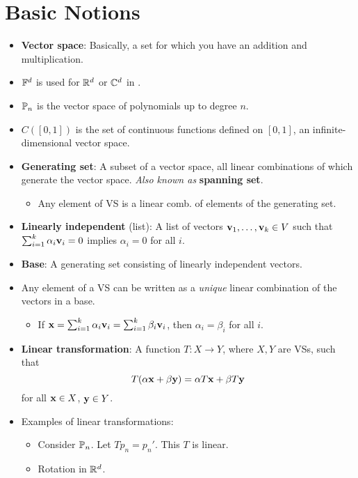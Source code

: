 \documentclass[../../notes.tex]{subfiles}
\begin{document}
\chapter{Basic Notions}
\begin{itemize}
    \item {}\textbf{Vector space}: Basically, a set for which you have an addition and multiplication.
    \item $\mathbb{F}^d$ is used for $\mathbb{R}^d$ or $\mathbb{C}^d$ in \textcite{bib:Treil}.
    \item $\mathbb{P}_n$ is the vector space of polynomials up to degree $n$.
    \item $C([0,1])$ is the set of continuous functions defined on $[0,1]$, an infinite-dimensional vector space.
    \item \textbf{Generating set}: A subset of a vector space, all linear combinations of which generate the vector space. \emph{Also known as} \textbf{spanning set}.
    \begin{itemize}
        \item Any element of VS is a linear comb. of elements of the generating set.
    \end{itemize}
    \item \textbf{Linearly independent} (list): A list of vectors $\mathbf{v}_1,\dots,\mathbf{v}_k\in V$ such that $\sum_{i=1}^k\alpha_i\mathbf{v}_i=0$ implies $\alpha_i=0$ for all $i$.
    \item \textbf{Base}: A generating set consisting of linearly independent vectors.
    \item Any element of a VS can be written as a \emph{unique} linear combination of the vectors in a base.
    \begin{itemize}
        \item If $\mathbf{x}=\sum_{i=1}^k\alpha_i\mathbf{v}_i=\sum_{i=1}^k\beta_i\mathbf{v}_i$, then $\alpha_i=\beta_i$ for all $i$.
    \end{itemize}
    \item \textbf{Linear transformation}: A function $T:X\to Y$, where $X,Y$ are VSs, such that
    \begin{equation*}
        T(\alpha\mathbf{x}+\beta\mathbf{y}) = \alpha T\mathbf{x}+\beta T\mathbf{y}
    \end{equation*}
    for all $\mathbf{x}\in X$, $\mathbf{y}\in Y$.
    \item Examples of linear transformations:
    \begin{itemize}
        \item Consider $\mathbb{P}_n$. Let $Tp_n=p_n'$. This $T$ is linear.
        \item Rotation in $\mathbb{R}^d$.

\end{itemize}
\end{itemize}
\end{document}
